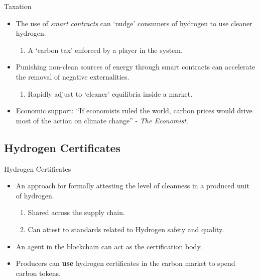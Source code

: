 \begin{frame}{Taxation}
    \begin{itemize}
        \item The use of \textit{smart contracts} can `nudge' consumers of
              hydrogen to use cleaner hydrogen.
              \begin{enumerate}
                  \item A `carbon tax' enforced by a player in the system.
              \end{enumerate}
        \item Punishing non-clean sources of energy through smart contracts
              can accelerate the removal of negative externalities.
              \begin{enumerate}
                  \item Rapidly adjust to `cleaner' equilibria inside a market.
              \end{enumerate}
        \item Economic support: ``If economists ruled the world, carbon
              prices would drive most of the action on climate change''
              - \textit{The Economist}.
    \end{itemize}
\end{frame}
\subsection{Hydrogen Certificates}
\begin{frame}{Hydrogen Certificates}
    \begin{itemize}
        \item An approach for formally attesting the level of cleanness in
              a produced unit of hydrogen.
              \begin{enumerate}
                  \item Shared across the supply chain.
                  \item Can attest to standards related to Hydrogen
                        safety and quality.
              \end{enumerate}
        \item An agent in the blockchain can act as the certification body.
        \item Producers can \textbf{use} hydrogen certificates in the carbon
              market to spend carbon tokens.
    \end{itemize}
\end{frame}
